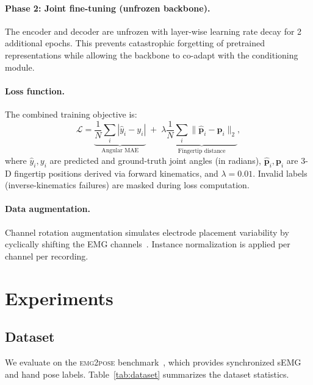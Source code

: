 \documentclass[10pt]{article}
\begin{document}
\paragraph{Phase 2: Joint fine-tuning (unfrozen backbone).}
The encoder and decoder are unfrozen with layer-wise learning rate decay for 2 additional epochs. This prevents catastrophic forgetting of pretrained representations while allowing the backbone to co-adapt with the conditioning module.

\paragraph{Loss function.}
The combined training objective is:
\begin{equation}
    \mathcal{L} = \underbrace{\frac{1}{N}\sum_{i} |\hat{y}_i - y_i|}_{\text{Angular MAE}} \;+\; \lambda \underbrace{\frac{1}{N}\sum_{i} \|\hat{\mathbf{p}}_i - \mathbf{p}_i\|_2}_{\text{Fingertip distance}},
    \label{eq:loss}
\end{equation}
where $\hat{y}_i, y_i$ are predicted and ground-truth joint angles (in radians), $\hat{\mathbf{p}}_i, \mathbf{p}_i$ are 3-D fingertip positions derived via forward kinematics, and $\lambda = 0.01$. Invalid labels (inverse-kinematics failures) are masked during loss computation.

\paragraph{Data augmentation.}
Channel rotation augmentation simulates electrode placement variability by cyclically shifting the EMG channels~\citep{salter2024emg2pose}. Instance normalization is applied per channel per recording.

\section{Experiments}
\label{sec:experiments}

\subsection{Dataset}
\label{sec:dataset}

We evaluate on the \textsc{emg2pose} benchmark~\citep{salter2024emg2pose}, which provides synchronized sEMG and hand pose labels. Table~\ref{tab:dataset} summarizes the dataset statistics.
\end{document}
